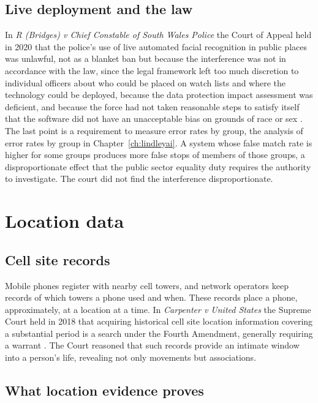 \subsection{Live deployment and the law}

In \emph{R (Bridges) v Chief Constable of South Wales Police} the Court of Appeal held in 2020 that the police's use of live automated facial recognition in public places was unlawful, not as a blanket ban but because the interference was not in accordance with the law, since the legal framework left too much discretion to individual officers about who could be placed on watch lists and where the technology could be deployed, because the data protection impact assessment was deficient, and because the force had not taken reasonable steps to satisfy itself that the software did not have an unacceptable bias on grounds of race or sex \citep{bridges2020}. The last point is a requirement to measure error rates by group, the analysis of error rates by group in Chapter~\ref{ch:lindleyai}. A system whose false match rate is higher for some groups produces more false stops of members of those groups, a disproportionate effect that the public sector equality duty requires the authority to investigate. The court did not find the interference disproportionate.

\section{Location data}

\subsection{Cell site records}

Mobile phones register with nearby cell towers, and network operators keep records of which towers a phone used and when. These records place a phone, approximately, at a location at a time. In \emph{Carpenter v United States} the Supreme Court held in 2018 that acquiring historical cell site location information covering a substantial period is a search under the Fourth Amendment, generally requiring a warrant \citep{carpenter2018}. The Court reasoned that such records provide an intimate window into a person's life, revealing not only movements but associations.

\subsection{What location evidence proves}


